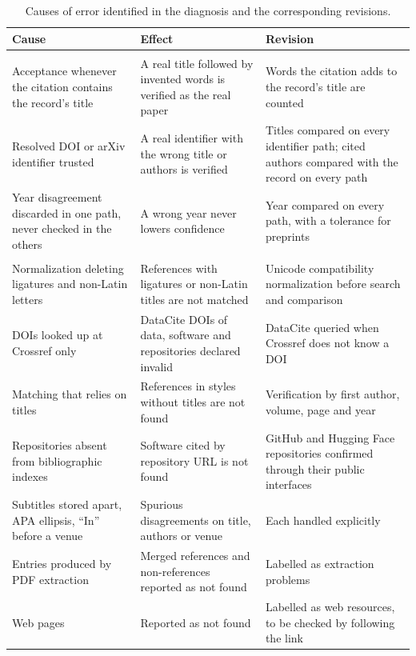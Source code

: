 \documentclass[pdflatex,sn-apa]{sn-jnl}
\begin{document}
\begin{table}[htbp]
\centering
\caption{Causes of error identified in the diagnosis and the corresponding revisions.}
\label{tab:revision}
\vspace{4pt}
\small
\begin{tabularx}{\textwidth}{>{\raggedright\arraybackslash}p{} >{\raggedright\arraybackslash}X >{\raggedright\arraybackslash}X}
\toprule
\textbf{Cause} & \textbf{Effect} & \textbf{Revision} \\
\midrule
\multicolumn{3}{l}{\textit{Problematic references accepted}} \\
Acceptance whenever the citation contains the record's title & A real title followed by invented words is verified as the real paper & Words the citation adds to the record's title are counted \\
Resolved DOI or arXiv identifier trusted & A real identifier with the wrong title or authors is verified & Titles compared on every identifier path; cited authors compared with the record on every path \\
Year disagreement discarded in one path, never checked in the others & A wrong year never lowers confidence & Year compared on every path, with a tolerance for preprints \\
\midrule
\multicolumn{3}{l}{\textit{Genuine references flagged}} \\
Normalization deleting ligatures and non-Latin letters & References with ligatures or non-Latin titles are not matched & Unicode compatibility normalization before search and comparison \\
DOIs looked up at Crossref only & DataCite DOIs of data, software and repositories declared invalid & DataCite queried when Crossref does not know a DOI \\
Matching that relies on titles & References in styles without titles are not found & Verification by first author, volume, page and year \\
Repositories absent from bibliographic indexes & Software cited by repository URL is not found & GitHub and Hugging Face repositories confirmed through their public interfaces \\
Subtitles stored apart, APA ellipsis, ``In'' before a venue & Spurious disagreements on title, authors or venue & Each handled explicitly \\
Entries produced by PDF extraction & Merged references and non-references reported as not found & Labelled as extraction problems \\
Web pages & Reported as not found & Labelled as web resources, to be checked by following the link \\
\bottomrule
\end{tabularx}
\end{table}
\end{document}
